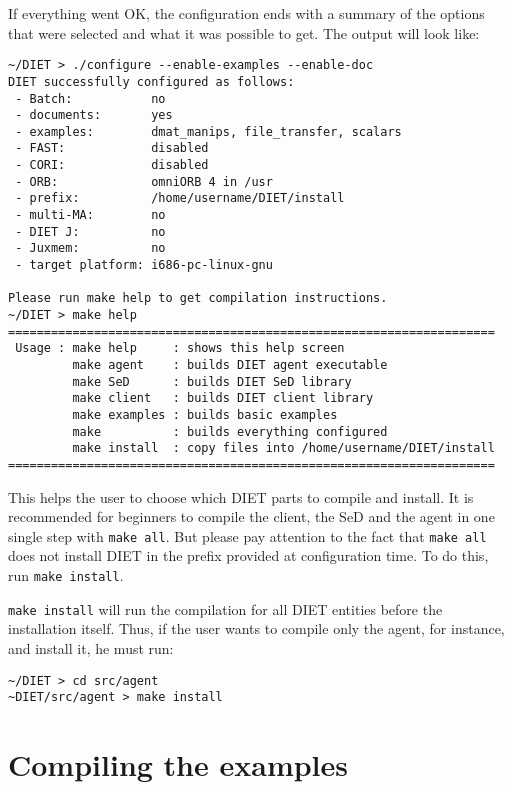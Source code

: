 If everything went OK, the configuration ends with a summary of the
options that were selected and what it was possible to get. The output
will look like: {\footnotesize
\begin{verbatim}
~/DIET > ./configure --enable-examples --enable-doc
DIET successfully configured as follows:
 - Batch:           no
 - documents:       yes
 - examples:        dmat_manips, file_transfer, scalars
 - FAST:            disabled
 - CORI:            disabled
 - ORB:             omniORB 4 in /usr
 - prefix:          /home/username/DIET/install
 - multi-MA:        no
 - DIET J:          no
 - Juxmem:          no
 - target platform: i686-pc-linux-gnu
 
Please run make help to get compilation instructions.
~/DIET > make help
====================================================================
 Usage : make help     : shows this help screen
         make agent    : builds DIET agent executable
         make SeD      : builds DIET SeD library
         make client   : builds DIET client library
         make examples : builds basic examples
         make          : builds everything configured
         make install  : copy files into /home/username/DIET/install
====================================================================
\end{verbatim}
}

This helps the user to choose which DIET parts to compile and
install. It is recommended for beginners to compile the client,
the SeD and the agent in one single step with \texttt{make all}. But
please pay attention to the fact that \texttt{make all} does not
install DIET in the prefix provided at configuration time. To do this,
run \texttt{make install}.

\texttt{make install} will run the compilation for all DIET entities
before the installation itself. Thus, if the user wants to compile
only the agent, for instance, and install it, he must run:
{\footnotesize
\begin{verbatim}
~/DIET > cd src/agent
~DIET/src/agent > make install
\end{verbatim}
}


\section{Compiling the examples}

